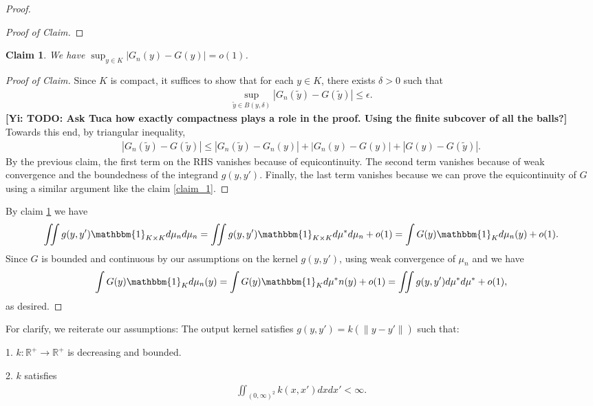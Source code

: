 \documentclass[10pt]{article}
\newcommand{\norm}[1]{\left\lVert#1\right\rVert}
\newcommand{\gy}[1]{\textbf{\color{red}[Yi: #1]}}
\newtheorem{claim}{\bf Claim}
\newenvironment{Proof of lemma}{\noindent{\bf Proof of Lemma}}{\hfill$\Box$\newline}
\newenvironment{Proof of claim}{\noindent{\bf Proof of claim}}{\hfill$\Box$\newline}
\newenvironment{Proof of theorem}{\noindent{\bf Proof of Theorem}}{\hfill\scriptsize{$\Box$}\newline}
\newenvironment{Proof of theorems}{\noindent{\bf Proof of Theorems}}{\hfill$\Box$\newline}
\newenvironment{Proof of proposition}{\noindent{\bf Proof of Proposition}}{\hfill$\Box$\newline}
\newenvironment{Proof of propositions}{\noindent{\bf Proof of Propositions}}{\hfill$\Box$\newline}
\newenvironment{Proof of exercise}{\noindent{\it Proof of Exercise:}}{\hfill$\Box$}
\numberwithin{equation}{section}
\begin{document}
\begin{proof}
\begin{proof}[Proof of Claim]
    \end{proof}
    \begin{claim} \label{claim_2}
        We have $\sup_{y \in K}|G_n(y)-G(y)|=o(1)$.
    \end{claim}
    \begin{proof}[Proof of Claim]
        Since $K$ is compact, it suffices to show that for each $y \in K$, there exists $\delta>0$ such that
        \begin{align}
            \sup_{\tilde{y}\in B(y,\delta)} |G_n(\tilde{y})-G(\tilde{y})| \leq \epsilon.
        \end{align}
        \gy{TODO: Ask Tuca how exactly compactness plays a role in the proof. Using the finite subcover of all the balls?}
        Towards this end, by triangular inequality,
        \begin{align}
            |G_n(\tilde{y})-G(\tilde{y})| \leq |G_n(\tilde{y})-G_n(y)|+|G_n(y)-G(y)|+|G(y)-G(\tilde{y})|.
        \end{align}
        By the previous claim, the first term on the RHS vanishes because of equicontinuity. The second term vanishes because of weak convergence and the boundedness of the integrand $g(y,y')$. Finally, the last term vanishes because we can prove the equicontinuity of $G$ using a similar argument like the claim \ref{claim_1}.
    \end{proof}
    By claim \ref{claim_2} we have
    \begin{align}
        \iint g(y,y') \mathbbm{1}_{K \times K} d\mu_n d\mu_n = \iint g(y,y') \mathbbm{1}_{K \times K} d\mu^* d\mu_n +o(1) = \int G(y) \mathbbm{1}_K d\mu_n(y)+o(1).
    \end{align}
    Since $G$ is bounded and continuous by our assumptions on the kernel $g(y,y')$, using weak convergence of $\mu_n$ and we have
    \begin{align}
        \int G(y) \mathbbm{1}_K d\mu_n(y) = \int G(y) \mathbbm{1}_K d\mu^*n(y) + o(1) = \iint g(y,y')d\mu^* d\mu^* + o(1),
    \end{align}
    as desired.
\end{proof}
For clarify, we reiterate our assumptions:
The output kernel satisfies $g(y,y') = k (\norm{y-y'})$ such that:

1. $k: \mathbb{R}^+ \to \mathbb{R}^+$ is decreasing and bounded.

2. $k$ satisfies
\begin{align}
    \iint_{(0,\infty)^2} k(x,x') dxdx' < \infty.
\end{align}
\end{document}
